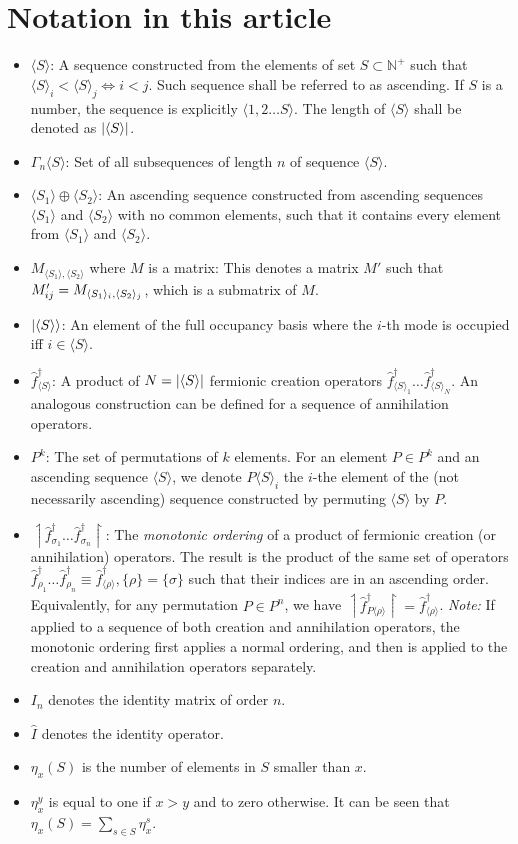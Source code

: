 \documentclass[12pt]{article}
\newcommand{\seq}[1]{\langle #1\rangle}
\newcommand{\asc}[1]{\upharpoonleft #1 \upharpoonright}
\newcommand{\hc}{^\dagger}
\begin{document}
	\section{Notation in this article}
	\begin{itemize}
		\item $\seq{S}$: A sequence constructed from the elements of set $S\subset \mathbb{N}^+$ such that\\ $\seq{S}_i< \seq{S}_j\iff i<j$. Such sequence shall be referred to as ascending. If $S$ is a number, the sequence is explicitly $\seq{1, 2\dots S}$. The length of $\seq{S}$ shall be denoted as $\abs{\seq{S}}$.
		\item $\Gamma_n\seq{S}$: Set of all subsequences of length $n$ of sequence $\seq{S}$.
		\item $\seq{S_1}\oplus\seq{S_2}$: An ascending sequence constructed from ascending sequences $\seq{S_1}$ and $\seq{S_2}$ with no common elements, such that it contains every element from $\seq{S_1}$ and $\seq{S_2}$.
		\item $M_{\seq{S_1},\seq{S_2}}$ where $M$ is a matrix: This denotes a matrix $M'$ such that $M'_{ij}=\nolinebreak M_{\seq{S_1}_i,\seq{S_2}_j}$, which is a submatrix of $M$.
		\item $\ket{\seq{S}}$: An element of the full occupancy basis where the $i$-th mode is occupied iff $i\in\seq{S}$.
		\item $\hat{f}\hc_{\seq{S}}$: A product of $N=\abs{\seq{S}}$ fermionic creation operators $\hat{f}\hc_{\seq{S}_1}\dots \hat{f}\hc_{\seq{S}_N}$. An analogous construction can be defined for a sequence of annihilation operators.
		\item $P^k$: The set of permutations of $k$ elements. For an element $P\in P^k$ and an ascending sequence $\seq{S}$, we denote $P\seq{S}_i$ the $i$-the element of the (not necessarily ascending) sequence constructed by permuting $\seq{S}$ by $P$.
		\item $\asc{\hat{f}\hc_{\sigma_1}\dots\hat{f}\hc_{\sigma_n}}$: The \textit{monotonic ordering} of a product of fermionic creation (or annihilation) operators. The result is the product of the same set of operators $\hat{f}\hc_{\rho_1}\dots\hat{f}\hc_{\rho_n}\equiv \hat{f}\hc_{\seq{\rho}}, \{\rho\}=\{\sigma\}$ such that their indices are in an ascending order. Equivalently, for any permutation $P\in P^n$, we have $\asc{\hat{f}\hc_{P\seq{\rho}}}=\hat{f}\hc_{\seq{\rho}}$. \textit{Note:} If applied to a sequence of both creation and annihilation operators, the monotonic ordering first applies a normal ordering, and then is applied to the creation and annihilation operators separately.
		\item $I_n$ denotes the identity matrix of order $n$.
		\item $\hat{I}$ denotes the identity operator.
		\item $\eta_x(S)$ is the number of elements in $S$ smaller than $x$.
		\item $\eta_x^y$ is equal to one if $x>y$ and to zero otherwise. It can be seen that $\eta_x(S)=\sum_{s\in S}\eta_x^s$.
	\end{itemize}
	
\end{document}

